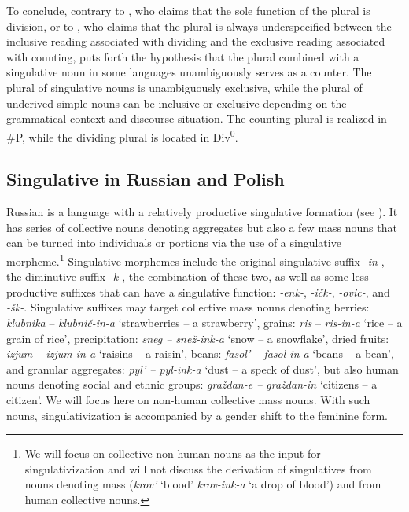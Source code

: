 \documentclass[output=paper,colorlinks,citecolor=brown,
]{langscibook}
\begin{document}
To conclude, contrary to \citet{Borer2005}, who claims that the sole function of the plural is division, or to \citet{Alexiadou2019}, who claims that the plural is always underspecified between the inclusive reading associated with dividing and the exclusive reading associated with counting, \citet{Mathieu2014} puts forth the hypothesis that the plural combined with a singulative noun in some languages unambiguously serves as a counter. The plural of singulative nouns is unambiguously exclusive, while the plural of underived simple nouns can be inclusive or exclusive depending on the grammatical context and discourse situation. The counting plural is realized in \#P, while the dividing plural is located in Div\textsuperscript{0}. 


\subsection{Singulative in Russian and Polish}\label{sec:3.2}

Russian is a language with a relatively productive singulative formation (see \citealt{GeistInprep}). It has series of collective nouns denoting aggregates but also a few mass nouns that can be turned into individuals or portions via the use of a singulative morpheme.\footnote{We will focus on collective non-human nouns as the input for singulativization and will not discuss the derivation of singulatives from nouns denoting mass (\textit{krov'} `blood' \textit{krov-ink-a} `a drop of blood') and from human collective nouns.} Singulative morphemes include the original singulative suffix \textit{-in-}, the diminutive suffix \textit{-k-}, the combination of these two, as well as some less productive suffixes that can have a singulative function: \textit{-enk-}, \textit{-ičk-}, \textit{-ovic-}, and \textit{-šk-}. Singulative suffixes may target collective mass nouns denoting berries: \textit{klubnika} -- \textit{klubnič-in-a} `strawberries -- a strawberry', grains: \textit{ris} -- \textit{ris-in-a} `rice -- a grain of rice', precipitation: \textit{sneg -- snež-ink-a} `snow -- a snowflake', dried fruits: \textit{izjum -- izjum-in-a} `raisins -- a raisin', beans: \textit{fasol' -- fasol-in-a} `beans -- a bean', and granular aggregates: \textit{pyl' -- pyl-ink-a} `dust -- a speck of dust', but also human nouns denoting social and ethnic groups: \textit{graždan-e -- graždan-in} `citizens --  a citizen'. We will focus here on non-human collective mass nouns. With such nouns, singulativization is accompanied by a gender shift to the feminine form.  
\end{document}
